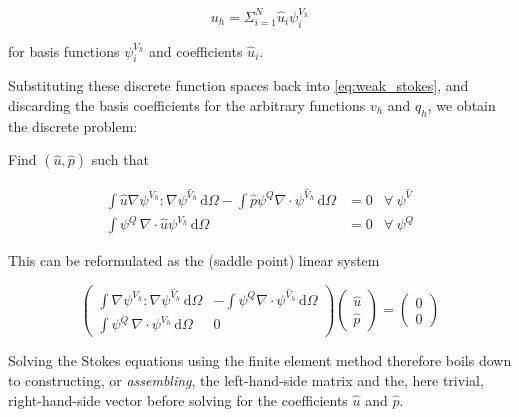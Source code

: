 \documentclass[thesis]{subfiles}
\begin{document}
\begin{equation*}
  u_h = \Sigma^N_{i=1} \hat u_i \psi^{V_h}_i
\end{equation*}

for basis functions $\psi^{V_h}_i$ and coefficients $\hat u_i$.

Substituting these discrete function spaces back into \cref{eq:weak_stokes}, and discarding the basis coefficients for the arbitrary functions $v_h$ and $q_h$, we obtain the discrete problem:

\vspace{1em}

Find $(\hat u, \hat p)$ such that

\begin{subequations}
  \begin{align}
    \int \hat u \nabla \psi^{V_h} : \nabla \psi^{\hat V_h} \, \textrm{d}\Omega
    - \int \hat p \psi^Q \nabla \cdot \psi^{\hat V_h} \, \textrm{d}\Omega
    &= 0
    &\forall \ \psi^{\hat V} \\
    \int \psi^Q \, \nabla \cdot \hat u \psi^{V_h} \, \textrm{d}\Omega
    &= 0
    &\forall \ \psi^{Q}
  \end{align}
  \label{eq:weak_stokes_discrete}
\end{subequations}

This can be reformulated as the (saddle point) linear system

\begin{equation}
  \left (
  \begin{array}{c|c}
    \int \nabla \psi^{V_h} : \nabla \psi^{\hat V_h} \, \textrm{d}\Omega
    &
    - \int \psi^Q \nabla \cdot \psi^{\hat V_h} \, \textrm{d}\Omega \\
    \hline
    \int \psi^Q \, \nabla \cdot \psi^{V_h} \, \textrm{d}\Omega
    &
    0
  \end{array}
  \right )
  \left (
  \begin{array}{c}
    \hat u \\
    \hline
    \hat p
  \end{array}
  \right )
  =
  \left (
  \begin{array}{c}
    0 \\ \hline 0
  \end{array}
  \right )
  \label{eq:stokes_linear_system}
\end{equation}

Solving the Stokes equations using the finite element method therefore boils down to constructing, or \textit{assembling}, the left-hand-side matrix and the, here trivial, right-hand-side vector before solving for the coefficients $\hat u$ and $\hat p$.
\end{document}
